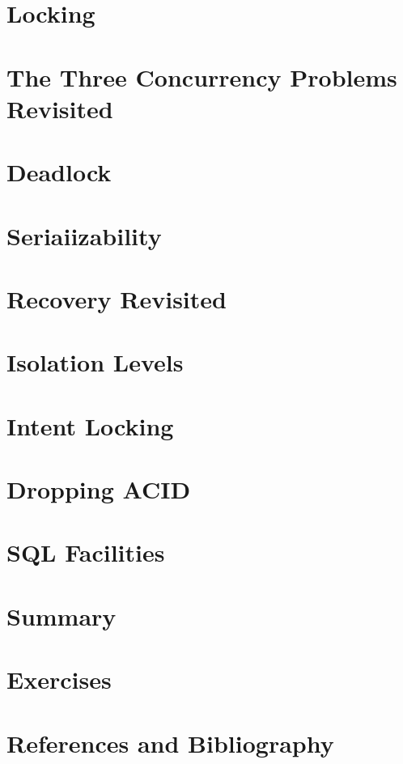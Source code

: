 \documentclass{book}
\begin{document}
\section{Locking}

\section{The Three Concurrency Problems Revisited}

\section{Deadlock}

\section{Seriaiizability}

\section{Recovery Revisited}

\section{Isolation Levels}

\section{Intent Locking}

\section{Dropping ACID}

\section{SQL Facilities}

\section{Summary}

\section{Exercises}

\section{References and Bibliography}
\end{document}
